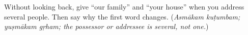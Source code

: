 \begin{tcolorbox}[breakable,colback=teal!4,colframe=teal!35!black,title={Before you move on}]
Without looking back, give “our family” and “your house” when you address several people. Then say why the first word changes. (\emph{Asmākam kuṭumbam; yuṣmākam gṛham; the possessor or addressee is several, not one.})
\end{tcolorbox}
